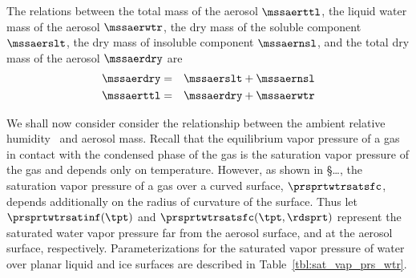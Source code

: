 \documentclass[12pt,twoside]{book}
\begin{document}
The relations between the 
total mass of the aerosol $\mssaerttl$, 
the liquid water mass of the aerosol $\mssaerwtr$,
the dry mass of the soluble component $\mssaerslt$,
the dry mass of insoluble component $\mssaernsl$,
and the total dry mass of the aerosol $\mssaerdry$ are
\begin{eqnarray}
\mssaerdry & = & \mssaerslt + \mssaernsl \\
\mssaerttl & = & \mssaerdry + \mssaerwtr
\label{eqn:mss_aer_ttl_dfn}
\end{eqnarray}

We shall now consider consider the relationship between the ambient
relative humidity \RH\ and aerosol mass.
Recall that the equilibrium vapor pressure of a gas in contact with
the condensed phase of the gas is the saturation vapor pressure of the
gas and depends only on temperature.
However, as shown in \S\ldots, the saturation vapor pressure of a
gas over a curved surface, $\prsprtwtrsatsfc$, depends additionally on
the radius of curvature of the surface.
Thus let $\prsprtwtrsatinf(\tpt)$ and $\prsprtwtrsatsfc(\tpt,\rdsprt)$ 
represent the saturated water vapor pressure far from the aerosol
surface, and at the aerosol surface, respectively.
Parameterizations for the saturated vapor pressure of water over
planar liquid and ice surfaces are described in
Table~\ref{tbl:sat_vap_prs_wtr}.  
\end{document}
